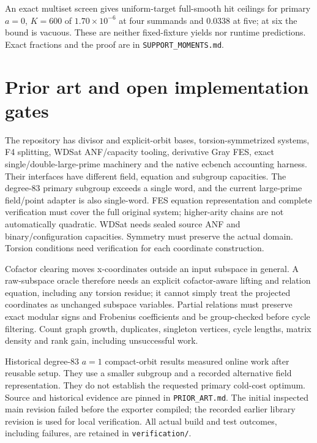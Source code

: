 \documentclass[11pt]{article}
\begin{document}
An exact multiset screen gives uniform-target full-smooth hit ceilings for primary $a=0$, $K=600$ of $1.70\times10^{-6}$ at four summands and 0.0338 at five; at six the bound is vacuous. These are neither fixed-fixture yields nor runtime predictions. Exact fractions and the proof are in \texttt{SUPPORT\_MOMENTS.md}.

\section*{Prior art and open implementation gates}
The repository has divisor and explicit-orbit bases, torsion-symmetrized systems, F4 splitting, WDSat ANF/capacity tooling, derivative Gray FES, exact single/double-large-prime machinery and the native ecbench accounting harness. Their interfaces have different field, equation and subgroup capacities. The degree-83 primary subgroup exceeds a single word, and the current large-prime field/point adapter is also single-word. FES equation representation and complete verification must cover the full original system; higher-arity chains are not automatically quadratic. WDSat needs sealed source ANF and binary/configuration capacities. Symmetry must preserve the actual domain. Torsion conditions need verification for each coordinate construction.

Cofactor clearing moves x-coordinates outside an input subspace in general. A raw-subspace oracle therefore needs an explicit cofactor-aware lifting and relation equation, including any torsion residue; it cannot simply treat the projected coordinates as unchanged subspace variables. Partial relations must preserve exact modular signs and Frobenius coefficients and be group-checked before cycle filtering. Count graph growth, duplicates, singleton vertices, cycle lengths, matrix density and rank gain, including unsuccessful work.

Historical degree-83 $a=1$ compact-orbit results measured online work after reusable setup. They use a smaller subgroup and a recorded alternative field representation. They do not establish the requested primary cold-cost optimum. Source and historical evidence are pinned in \texttt{PRIOR\_ART.md}. The initial inspected main revision failed before the exporter compiled; the recorded earlier library revision is used for local verification. All actual build and test outcomes, including failures, are retained in \texttt{verification/}.
\end{document}
